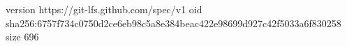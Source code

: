 version https://git-lfs.github.com/spec/v1
oid sha256:6757f734c0750d2ce6eb98c5a8e384beac422e98699d927c42f5033a6f830258
size 696
